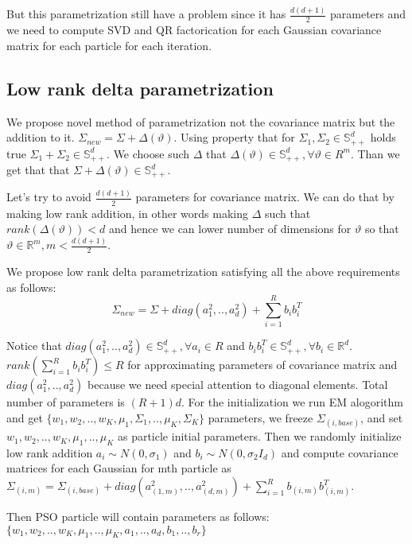 \documentclass[a4paper]{article}
\begin{document}
But this parametrization still have a problem since it has $\frac{d(d+1)}{2}$ parameters and we need to compute SVD 
and QR factorication for each Gaussian covariance matrix for each particle for each iteration.

\subsection{Low rank delta parametrization}

We propose novel method of parametrization not the covariance matrix but the addition to it. $\Sigma_{new}  = \Sigma + \Delta(\vartheta)$. 
Using property that for $\Sigma_1, \Sigma_2 \in \mathbb{S}^d_{++}$ holds true $\Sigma_1 + \Sigma_2 \in \mathbb{S}^d_{++}$.
We choose such $\Delta$ that $\Delta(\vartheta) \in \mathbb{S}^d_{++}, \forall \vartheta \in R^m$. 
Than we get that that $\Sigma + \Delta(\vartheta) \in \mathbb{S}^d_{++}$.

Let's try to avoid $\frac{d(d+1)}{2}$ parameters for covariance matrix. We can do that by making low rank addition,
 in other words making $\Delta$ such that $rank(\Delta(\vartheta)) < d$ and 
 hence we can lower number of dimensions for $\vartheta$ so that $\vartheta \in \mathbb{R}^{m}, m < \frac{d(d+1)}{2}$.

 We propose low rank delta parametrization satisfying all the above requirements as follows:
 $$\Sigma_{new}  = \Sigma + diag(a_1^2, .., a_d^2) + \sum_{i=1}^{R}b_ib_i^T$$

 Notice that $diag(a_1^2, .., a_d^2) \in \mathbb{S}^d_{++}, \forall a_i \in R$ and $b_ib_i^T \in \mathbb{S}^d_{++}, \forall b_i \in \mathbb{R}^{d}$. 
 $rank(\sum_{i=1}^{R} b_ib_i^T) \leq R$ for approximating parameters of covariance matrix and 
 $diag(a_1^2, .., a_d^2)$ because we need special attention to diagonal elements. 
 Total number of parameters is $(R + 1)d$. For the initialization we run EM alogorithm and get 
 $\{w_1, w_2, .., w_K, \mu_1, \Sigma_1, .., \mu_K, \Sigma_K\}$ parameters, we freeze $\Sigma_{(i, base)}$, 
 and set ${w_1, w_2, .., w_K, \mu_1, .., \mu_K}$ as particle initial parameters. 
 Then we randomly initialize low rank addition $a_i \sim N(0, \sigma_1)$ and $b_i \sim N(0, \sigma_2 I_d)$ and 
 compute covariance matrices for each Gaussian for mth particle as 
 $\Sigma_{(i, m)} = \Sigma_{(i, base)} + diag(a_{(1, m)}^2, .., a_{(d, m)}^2) + \sum_{i=1}^{R}b_{(i, m)}b_{(i, m)}^T$. 

 Then PSO particle will contain parameters as follows: $\{ w_1, w_2, .., w_K, \mu_1, .., \mu_K, a_1, .., a_d, b_1, .., b_r\}$
\end{document}
